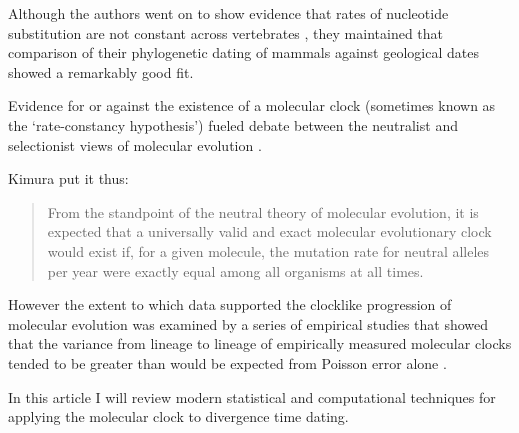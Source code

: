 Although the authors went on to show evidence that rates of nucleotide substitution are not constant across vertebrates \cite{LangleyFitch1974}, they maintained that comparison of their phylogenetic dating of mammals against geological dates showed a remarkably good fit. 

Evidence for or against the existence of a molecular clock (sometimes known as the `rate-constancy hypothesis') fueled debate between the neutralist and selectionist views of molecular evolution \cite{Kimura1987}.

Kimura \cite{Kimura1987} put it thus:

\begin{quotation}
From the standpoint of the neutral theory of molecular evolution, it is expected that a universally valid and exact molecular evolutionary clock would exist if, for a given molecule, the mutation rate for neutral alleles per year were exactly equal among all organisms at all times.
\end{quotation}
 
However the extent to which data supported the clocklike progression of molecular evolution was examined by a series of empirical studies that showed that the variance from lineage to lineage of empirically measured molecular clocks tended to be greater than would be expected from Poisson error alone \cite{LangleyFitch1974,Kimura1987}.

In this article I will review modern statistical and computational techniques for applying the molecular clock to divergence time dating.

  
  
  
  
  
  
  
  
  
  
  
  
  
  
  
  
  
  
  
  
  
  
  
  
  